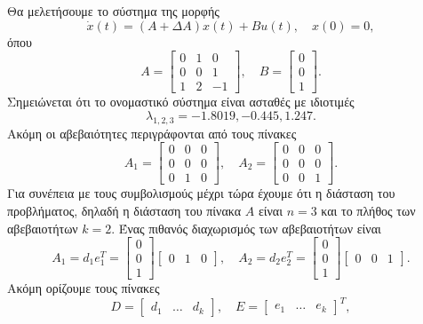 Θα μελετήσουμε το σύστημα της μορφής
\[
    \dot{x}(t) = (A + \Delta A)x(t) + Bu(t), \quad x(0) = 0,
\]
όπου
\[
    A =
    \begin{bmatrix}
        0 & 1 & 0 \\
        0 & 0 & 1 \\
        1 & 2 & -1
    \end{bmatrix}, \quad
    B =
    \begin{bmatrix}
        0 \\
        0 \\
        1
    \end{bmatrix}.
\]
Σημειώνεται ότι το ονομαστικό σύστημα είναι ασταθές με ιδιοτιμές
\[
    \lambda_{1, 2, 3} = -1.8019, -0.445, 1.247.
\]
Ακόμη οι αβεβαιότητες περιγράφονται από τους πίνακες
\[
    A_1 =
    \begin{bmatrix}
        0 & 0 & 0 \\
        0 & 0 & 0 \\
        0 & 1 & 0
    \end{bmatrix}, \quad
    A_2 =
    \begin{bmatrix}
        0 & 0 & 0 \\
        0 & 0 & 0 \\
        0 & 0 & 1
    \end{bmatrix}.
\]
Για συνέπεια με τους συμβολισμούς μέχρι τώρα έχουμε ότι η διάσταση του
προβλήματος, δηλαδή η διάσταση του πίνακα \( A \) είναι \( n = 3 \) και το
πλήθος των αβεβαιοτήτων \( k = 2 \). Ένας πιθανός διαχωρισμός των αβεβαιοτήτων
είναι
\[
    A_1 = d_1e_1^T =
    \begin{bmatrix}
        0 \\
        0 \\
        1
    \end{bmatrix}
    \begin{bmatrix}
        0 & 1 & 0
    \end{bmatrix}, \quad
    A_2 = d_2e_2^T =
    \begin{bmatrix}
        0 \\
        0 \\
        1
    \end{bmatrix}
    \begin{bmatrix}
        0 & 0 & 1
    \end{bmatrix}.
\]
Ακόμη ορίζουμε τους πίνακες
\[
    D = \begin{bmatrix} d_1 & \dots & d_k\end{bmatrix}, \quad
    E = \begin{bmatrix} e_1 & \dots & e_k\end{bmatrix}^T,
\]
